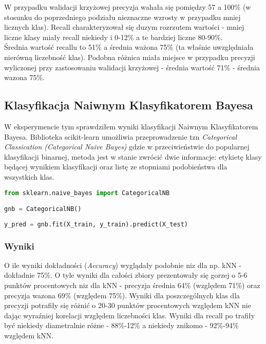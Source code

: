 W przypadku walidacji krzyżowej precyzja wahała się pomiędzy 57 a 100\% (w stosunku do poprzedniego podziału nieznaczne wzrosty w przypadku mniej licznych klas). Recall charakteryzował się duzym rozrzutem wartości - mniej liczne klasy miały recall niekiedy i 0-12\% a te bardziej liczne 80-90\%.\\

Średnia wartość recallu to 51\% a średnia ważona 75\% (ta właśnie uwzględniała nierówną liczebność klas). Podobna różnica miała miejsce w przypadku precyzji wyliczonej przy zastosowaniu walidacji krzyżowej - średnia wartość 71\% - średnia wazona 75\%.\\

\subsection{Klasyfikacja Naiwnym Klasyfikatorem Bayesa}
W eksperymencie tym sprawdziłem wyniki klasyfikacji Naiwnym Klasyfikatorem Bayesa. Biblioteka scikit-learn umożliwia przeprowadzenie tzn \textit{Categorical Classication (Categorical Naive Bayes)} gdzie w przeciwieństwie do popularnej klasyfikacji binarnej, metoda jest w stanie zwrócić dwie informacje: etykietę klasy będącej wynikiem klasyfikacji oraz listę ze stopniami podobieństwa dla wszystkich klas.\\

\begin{lstlisting}[language=Python, caption=Definicja i uzycie CategoricalNB]
from sklearn.naive_bayes import CategoricalNB

gnb = CategoricalNB()
    
y_pred = gnb.fit(X_train, y_train).predict(X_test)
\end{lstlisting}    

\subsubsection{Wyniki}
O ile wyniki dokładności (\textit{Accuracy}) wyglądały podobnie niz dla np. kNN - dokładnie 75\%. O tyle wyniki dla całości zbiory prezentowały się gorzej o 5-6 punktów procentowych niz dla kNN - precyzja średnia 64\% (względem 71\%) oraz precyzja wazona 69\% (względem 75\%). Wyniki dla poszczególnych klas dla precyzji potrafiły się różnić o 20-30 punktów procentowych względem kNN nie dając wyraźniej korelacji względem liczebności klas. Wyniki dla recall po trafiły być niekiedy diametralnie różne - 88\%-12\% a niekiedy znikomo - 92\%-94\% względem kNN.\\


